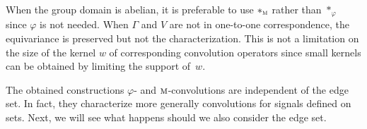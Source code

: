 When the group domain is abelian, it is preferable to use $\ast_{\operatorname{\textsc{m}}}$ rather than $\ast_{\varphi}$ since $\varphi$ is not needed. When $\Gamma$ and $V$ are not in one-to-one correspondence, the equivariance is preserved but not the characterization. This is not a limitation on the size of the kernel $w$ of corresponding convolution operators since small kernels can be obtained by limiting the support of~$w$.

\vspace{5pt}

The obtained constructions $\varphi$- and $\operatorname{\textsc{m}}$-convolutions are independent of the edge set. In fact, they characterize more generally convolutions for signals defined on sets. Next, we will see what happens should we also consider the edge set.

